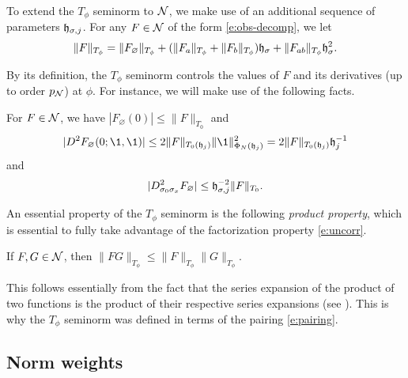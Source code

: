 To extend the $T_\phi$ seminorm to $\mathcal{N}$, we make use of an additional sequence
of parameters $\mathfrak{h}_{\sigma,j}$. For any $F \in \mathcal{N}$ of the form \eqref{e:obs-decomp},
we let
\begin{equation}
\|F\|_{T_\phi}
	=
\|F_\varnothing\|_{T_\phi}
	+ (\|F_a\|_{T_\phi} + \|F_b\|_{T_\phi}) \mathfrak{h}_\sigma
	+ \|F_{ab}\|_{T_\phi} \mathfrak{h}_\sigma^2.
\end{equation}

By its definition, the $T_\phi$ seminorm controls the values of $F$ and its derivatives
(up to order $p_{\mathcal{N}}$) at $\phi$. For instance, we will make use of the following facts.

\begin{lemma}
\label{lem:deriv-norm-bds}
For $F \in \mathcal{N}$, we have $|F_\varnothing(0)| \le \|F\|_{T_0}$ and
\begin{equation}
\label{e:deriv-norm-bd}
|D^2 F_\varnothing(0; \1, \1)|
	\le
2 \|F\|_{T_0(\h_j)} \|\1\|^2_{\Phi_N(\h_j)}
	=
2 \|F\|_{T_0(\h_j)} \h_j^{-1}
\end{equation}
and
\begin{equation}
|D^2_{\sigma_0\sigma_x} F_\varnothing|
	\le
\mathfrak{h}_{\sigma,j}^{-2} \|F\|_{T_0}.
\end{equation}
\end{lemma}

An essential property of the $T_\phi$ seminorm is the following \emph{product property},
which is essential to fully take advantage of the factorization property \eqref{e:uncorr}.

\begin{prop}
\label{prop:prod}
If $F, G \in \mathcal{N}$, then $\|F G\|_{T_\phi} \le \|F\|_{T_\phi} \|G\|_{T_\phi}$.
\end{prop}

\begin{rk}
This follows essentially from the fact that
the series expansion of the product of two functions is the product of their
respective series expansions (see \cite{BS-rg-norm}). This is why the $T_\phi$
seminorm was defined in terms of the pairing \eqref{e:pairing}.
\end{rk}


\subsection{Norm weights}
\label{sec:weights}


